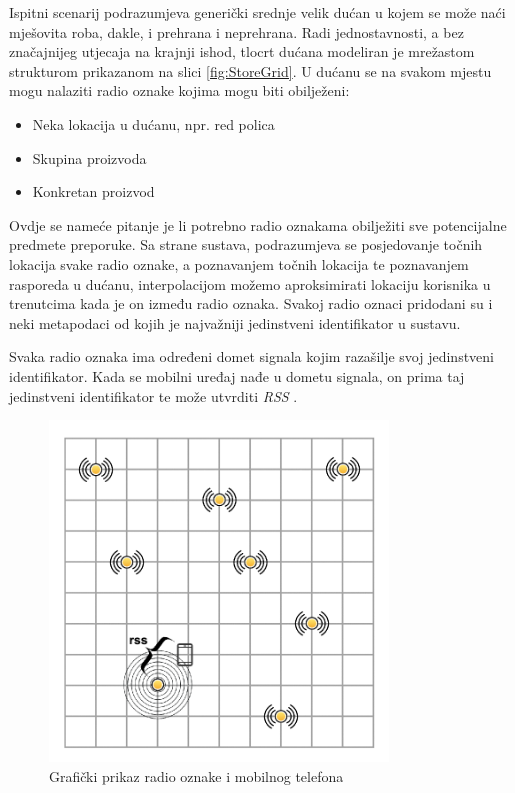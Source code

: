 \documentclass[times, utf8, diplomski, numeric]{fer}
\begin{document}
Ispitni scenarij podrazumjeva generički srednje velik dućan u kojem se
može naći mješovita roba, dakle, i prehrana i neprehrana. Radi jednostavnosti, a
bez značajnijeg utjecaja na krajnji ishod, tlocrt dućana modeliran je mrežastom
strukturom prikazanom na slici \ref{fig:StoreGrid}. U dućanu se na svakom mjestu
mogu nalaziti radio oznake  kojima mogu biti obilježeni:
\begin{itemize}
  \item Neka lokacija u dućanu, npr. red polica
  \item Skupina proizvoda
  \item Konkretan proizvod
\end{itemize}
Ovdje se nameće pitanje je li potrebno radio oznakama obilježiti sve
potencijalne predmete preporuke. Sa strane sustava, podrazumjeva se
posjedovanje točnih lokacija svake radio oznake, a poznavanjem točnih lokacija
te poznavanjem rasporeda u dućanu, interpolacijom možemo aproksimirati lokaciju
korisnika u trenutcima kada je on između radio oznaka. Svakoj radio oznaci
pridodani su i neki metapodaci od kojih je najvažniji jedinstveni identifikator
u sustavu.

Svaka radio oznaka ima određeni domet signala kojim razašilje 
svoj jedinstveni identifikator. Kada se mobilni uređaj nađe u dometu signala, on
prima taj jedinstveni identifikator te može utvrditi \emph{RSS} . 

\begin{figure}[htb]
	\centering
	\includegraphics[width=9cm]{images/gridbeacons1cell.png}
	\caption{Grafički prikaz radio oznake i mobilnog telefona}
	\label{fig:RssOneCell}
\end{figure}
\end{document}
